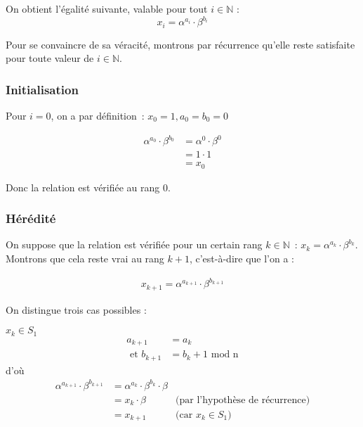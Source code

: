         On obtient l'égalité suivante, valable pour tout $i \in \mathbb{N}$ :
        \begin{equation} \label{eq:1}
          x_i = \alpha^{a_i} \cdot \beta^{b_i}
        \end{equation}

        Pour se convaincre de sa véracité, montrons par récurrence qu'elle reste satisfaite pour toute valeur de $i \in \mathbb{N}$.

        \subsubsection{Initialisation}

        Pour $i = 0$, on a par définition~: $x_0 = 1, a_0 = b_0 = 0$

        \begin{align*}
          \alpha^{a_0} \cdot \beta^{b_0} &= \alpha^{0} \cdot \beta^{0} \\
                                         &= 1 \cdot 1 \\
                                         &= x_0
        \end{align*}

        Donc la relation est vérifiée au rang 0.

        \subsubsection{Hérédité}

        On suppose que la relation est vérifiée pour un certain rang $k \in \mathbb{N}$~: $x_k = \alpha^{a_k} \cdot \beta^{b_k}$. Montrons que cela reste vrai au rang $k + 1$, c'est-à-dire que l'on a :

        \begin{align*}
          x_{k+1} = \alpha^{a_{k+1}} \cdot \beta^{b_{k+1}}
        \end{align*}

        On distingue trois cas possibles :

        \underline{$x_{k} \in S_1$}
        \begin{align*}
          a_{k+1} &= a_k \\
          \text{\ et } b_{k+1} &= b_k + 1 \text{\ mod n}
        \end{align*}
        d'où
        \begin{align*}
          \alpha^{a_{k+1}} \cdot \beta^{b_{k+1}} &= \alpha^{a_k} \cdot \beta^{b_k} \cdot \beta \\
                                                 &= x_k \cdot \beta & \text{(par l'hypothèse de récurrence)} \\
                                                 &= x_{k+1} & \text{(car $x_k \in S_1$)}
        \end{align*}


